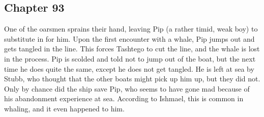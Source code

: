 \subsection{Chapter 93}

One of the oarsmen sprains their hand, leaving Pip (a rather timid, weak boy)
to substitute in for him. Upon the first encounter with a whale, Pip jumps out
and gets tangled in the line. This forces Tashtego to cut the line, and the
whale is lost in the process. Pip is scolded and told not to jump out of the
boat, but the next time he does quite the same, except he does not get tangled.
He is left at sea by Stubb, who thought that the other boats might pick up him
up, but they did not. Only by chance did the ship save Pip, who seems to have
gone mad because of his abandonment experience at sea. According to Ishmael,
this is common in whaling, and it even happened to him.
